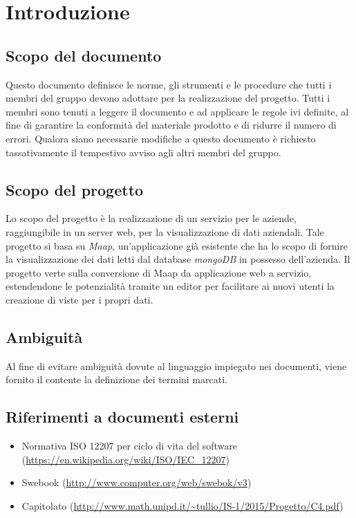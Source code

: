 \section{Introduzione}
\subsection{Scopo del documento}
Questo documento definisce le norme, gli strumenti e le procedure che tutti i membri del gruppo devono adottare per la realizzazione del progetto. Tutti i membri sono tenuti a leggere il documento e ad applicare le regole ivi definite, al fine di garantire la conformità del materiale prodotto e di ridurre il numero di errori. Qualora siano necessarie modifiche a questo documento è richiesto tassativamente il tempestivo avviso agli altri membri del gruppo.

\subsection{Scopo del progetto}
Lo scopo del progetto è la realizzazione di un servizio per le aziende, raggiungibile in un server web, per la visualizzazione di dati aziendali. Tale progetto si basa su \textit{Maap}, un'applicazione già esistente che ha lo scopo di fornire la visualizzazione dei dati letti dal database \textit{mongoDB} in possesso dell'azienda. Il progetto verte sulla conversione di Maap da applicazione web a servizio, estendendone le potenzialità tramite un editor per facilitare ai nuovi utenti la creazione di viste per i propri dati.

\subsection{Ambiguit\`a}
Al fine di evitare ambiguità dovute al linguaggio impiegato nei documenti, viene fornito il \Glossario contente la definizione dei termini marcati.

\subsection{Riferimenti a documenti esterni}
\begin{itemize}
\item Normativa ISO 12207 per ciclo di vita del software (\url{https://en.wikipedia.org/wiki/ISO/IEC_12207})
\item Swebook (\url{http://www.computer.org/web/swebok/v3})
\item Capitolato (\url{http://www.math.unipd.it/~tullio/IS-1/2015/Progetto/C4.pdf})
\end{itemize}
